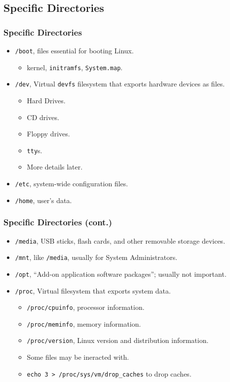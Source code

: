 \documentclass[xcolor={dvipsnames,svgnames},hyperref=dvips]{beamer}
\begin{document}
	\subsection{Specific Directories}
	\begin{frame}
		\frametitle{Specific Directories}
		\begin{itemize}
		\item \texttt{/boot}, files essential for booting Linux.
			\begin{itemize}
			\item kernel, \texttt{initramfs}, \texttt{System.map}.
			\end{itemize}
		\item \texttt{/dev}, Virtual \texttt{devfs} filesystem that exports hardware devices as files.
			\begin{itemize}
			\item Hard Drives.
			\item CD drives.
			\item Floppy drives.
			\item \texttt{tty}s.
			\item More details later.
			\end{itemize}
		\item \texttt{/etc}, system-wide configuration files.
		\item \texttt{/home}, user's data.
		\end{itemize}
	\end{frame}

	\begin{frame}
		\frametitle{Specific Directories (cont.)}
		\begin{itemize}
		\item \texttt{/media}, USB sticks, flash cards, and other removable storage devices.
		\item \texttt{/mnt}, like \texttt{/media}, usually for System Administrators.
		\item \texttt{/opt}, ``Add-on application software packages''; usually not important.
		\item \texttt{/proc}, Virtual filesystem that exports system data.
			\begin{itemize}
			\item \texttt{/proc/cpuinfo}, processor information.
			\item \texttt{/proc/meminfo}, memory information.
			\item \texttt{/proc/version}, Linux version and distribution information.
			\item Some files may be ineracted with.
			\item \texttt{echo 3 > /proc/sys/vm/drop\_caches} to drop caches.
			\end{itemize}
		\end{itemize}
	\end{frame}
		
\end{document}
